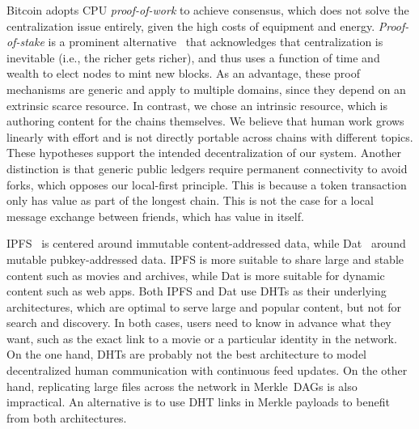\documentclass[10pt,journal,compsoc]{IEEEtran}
\begin{document}
Bitcoin adopts CPU \emph{proof-of-work} to achieve consensus, which does not
solve the centralization issue entirely, given the high costs of equipment and
energy.
\emph{Proof-of-stake} is a prominent alternative~\cite{p2p.proofs} that
acknowledges that centralization is inevitable (i.e., the richer gets richer),
and thus uses a function of time and wealth to elect nodes to mint new blocks.
As an advantage, these proof mechanisms are generic and apply to multiple
domains, since they depend on an extrinsic scarce resource.
%
In contrast, we chose an intrinsic resource, which is authoring content for the
chains themselves.
We believe that human work grows linearly with effort and is not directly
portable across chains with different topics.
These hypotheses support the intended decentralization of our system.
%
Another distinction is that generic public ledgers require permanent
connectivity to avoid forks, which opposes our local-first principle.
This is because a token transaction only has value as part of the longest
chain.
This is not the case for a local message exchange between friends, which has
value in itself.

IPFS~\cite{p2p.ipfs} is centered around immutable content-addressed data, while
Dat~\cite{p2p.dat} around mutable pubkey-addressed data.
IPFS is more suitable to share large and stable content such as movies and
archives, while Dat is more suitable for dynamic content such as web apps.
%
Both IPFS and Dat use DHTs as their underlying architectures, which are optimal
to serve large and popular content, but not for search and discovery.
In both cases, users need to know in advance what they want, such as the exact
link to a movie or a particular identity in the network.
%
On the one hand, DHTs are probably not the best architecture to model
decentralized human communication with continuous feed updates.
On the other hand, replicating large files across the network in Merkle~DAGs is
also impractical.
An alternative is to use DHT links in Merkle payloads to benefit from both
architectures.
\end{document}
